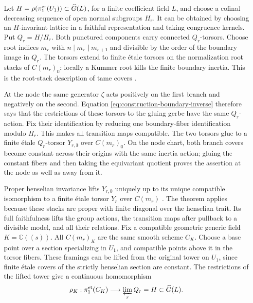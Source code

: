 Let $H=\rho(\pi_1^{\mathrm{et}}(U_1))\subset\widehat G(L)$, for a finite
coefficient field $L$, and choose a cofinal decreasing sequence of
open normal subgroups $H_r$.  It can be obtained by choosing an
$H$-invariant lattice in a faithful representation and taking
congruence kernels.  Put $Q_r=H/H_r$.  Both punctured components carry
connected $Q_r$-torsors.  Choose root indices $m_r$ with
$n\mid m_r\mid m_{r+1}$ and divisible by the order of the boundary
image in $Q_r$.  The torsors extend to finite \'etale torsors on the
normalization root stacks of $C(m_r)_0$: locally a Kummer root kills
the finite boundary inertia.  This is the root-stack description of
tame covers \cite[Proposition~A.10]{LieblichOlsson}.

At the node the same generator $\zeta$ acts positively on the first
branch and negatively on the second.  Equation
\eqref{eq:construction-boundary-inverse} therefore says that the
restrictions of these torsors to the gluing gerbe have the same
$Q_r$-action.  Fix their identification by reducing one boundary-fiber
identification modulo $H_r$.  This makes all transition maps compatible.
The two torsors glue to a finite \'etale $Q_r$-torsor $Y_{r,0}$ over
$C(m_r)_0$.  On the node chart, both branch covers become constant
across their origins with the same inertia action; gluing the constant
fibers and then taking the equivariant quotient proves the assertion
at the node as well as away from it.

Proper henselian invariance lifts $Y_{r,0}$ uniquely up to its unique
compatible isomorphism to a finite \'etale torsor $Y_r$ over $C(m_r)$
\cite[Theorem~4.5]{Rydh}.  The theorem applies because these stacks are
proper with finite diagonal over the henselian trait.  Its full
faithfulness lifts the group actions, the transition maps after
pullback to a divisible model, and all their relations.  Fix a
compatible geometric generic field
$K=\overline{\mathbb C((s))}$.  All $C(m_r)_K$ are the same smooth
scheme $C_K$.  Choose a base point over a section specializing in
$U_1$, and compatible points above it in the torsor fibers.  These
framings can be lifted from the original tower on $U_1$, since finite
\'etale covers of the strictly henselian section are constant.
The restrictions of the lifted tower give a continuous homomorphism
\begin{equation}\label{eq:construction-generic-parameter}
 \rho_K:\pi_1^{\mathrm{et}}(C_K)\longrightarrow
 \varprojlim_r Q_r=H\subset\widehat G(L).
\end{equation}

